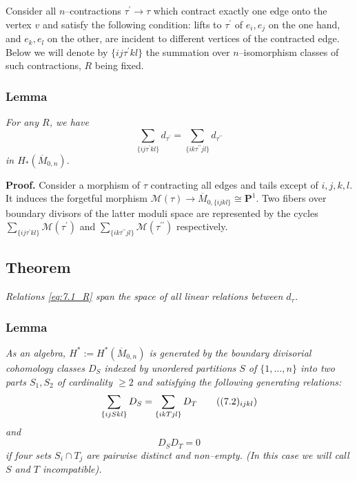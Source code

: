 \documentclass[reqno]{amsart}
\theoremstyle{definition}
\begin{document}
\smallskip

Consider all $n$--contractions $\tau^\prime\to\tau$ which contract
exactly one edge onto the vertex $v$ and satisfy the following
condition: lifts to $\tau^\prime$ of $e_i,e_j$ on the one hand,
and $e_k,e_l$ on the other, are incident to different vertices
of the contracted edge. Below we will denote by
$\{ ij\tau^\prime kl\}$ the summation over $n$--isomorphism classes
of such contractions, $R$ being fixed.

\smallskip

\subsubsection{Lemma}
{\it
  For any $R$, we have
  \begin{equation*}
    \sum_{\{ij\tau^\prime kl\}}d_{\tau^\prime}=
    \sum_{\{ik\tau^{\prime\prime}jl\}}d_{\tau^{\prime\prime}}
    \tag{$(7.1)_R$}
    \label{eq:7.1_R}
  \end{equation*}
  in $H_*(\overline{M}_{0,n})$.
}

\smallskip

\textbf{Proof.}
Consider a morphism of $\tau$ contracting all edges
and tails except of $i,j,k,l$. It induces the forgetful
morphism
$\mathcal{M}(\tau )\to \overline{M}_{0,\{ ijkl\}}\cong \mathbf{P}^1$.
Two fibers over boundary divisors of the latter moduli
space are represented by the cycles
$\sum_{\{ ij\tau^{\prime}kl\}}\mathcal{M}(\tau^{\prime})$ and
$\sum_{\{ik\tau^{\prime\prime}jl\}}\mathcal{M}(\tau^{\prime\prime})$
respectively.

\medskip

\subsection{Theorem}
{\it
  Relations \ref{eq:7.1_R} span the space
  of all linear relations between $d_{\tau}$.
}

\smallskip

\subsubsection{Lemma \cite{Ke}}
{\it
  As an algebra,
  $H^*:=H^*(\overline{M}_{0,n})$ is generated by the boundary divisorial
  cohomology classes $D_S$ indexed by unordered partitions
  $S$ of $\{ 1,\dots ,n\}$ into two parts $S_1,S_2$ of
  cardinality $\ge 2$ and satisfying the following generating relations:
  \begin{equation*}
    \sum_{\{ ijSkl\}}D_S=\sum_{\{ ikTjl\}}D_T
    \tag{$(7.2)_{ijkl}$}
  \end{equation*}
  and
  \begin{equation*}
    D_SD_T=0
    \tag{7.3}
  \end{equation*}
  if four sets $S_i\cap T_j$ are pairwise distinct and non--empty.
  (In this case we will call $S$ and $T$ incompatible).
}
\end{document}
